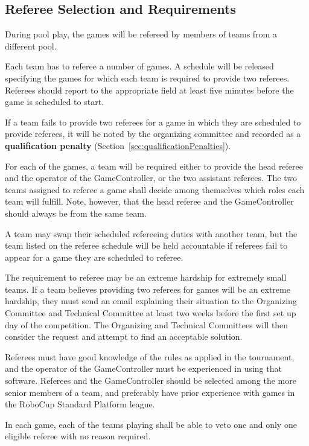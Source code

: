 \documentclass[12pt]{article}
\begin{document}
\subsection{Referee Selection and Requirements}
\label{sec:refSelection}
During pool play, the games will be refereed by members of teams from a different pool.

Each team has to referee a number of games. A schedule will be released specifying the games for which each team is required to provide two referees. Referees should report to the appropriate field at least five minutes before the game is scheduled to start.

If a team fails to provide two referees for a game in which they are scheduled to provide referees, it will be noted by the organizing committee and recorded as a \textbf{qualification penalty} (Section~\ref{sec:qualificationPenalties}).

For each of the games, a team will be required either to provide the head referee and the operator of the GameController, or the two assistant referees.  The two teams assigned to referee a game shall decide among themselves which roles each team will fulfill. Note, however, that the head referee and the GameController should always be from the same team.

A team may swap their scheduled refereeing duties with another team, but the team listed on the referee schedule will be held accountable if referees fail to appear for a game they are scheduled to referee.

The requirement to referee may be an extreme hardship for extremely small teams.  If a team believes providing two referees for games will be an extreme hardship, they must send an email explaining their situation to the Organizing Committee and Technical Committee at least two weeks before the first set up day of the competition.  The Organizing and Technical Committees will then consider the request and attempt to find an acceptable solution.

Referees must have good knowledge of the rules as applied in the tournament, and the operator of the GameController must be experienced in using that software. Referees and the GameController should be selected among the more senior members of a team, and preferably have prior experience with games in the RoboCup Standard Platform league.

In each game, each of the teams playing shall be able to veto one and only one eligible referee with no reason required.
\end{document}
